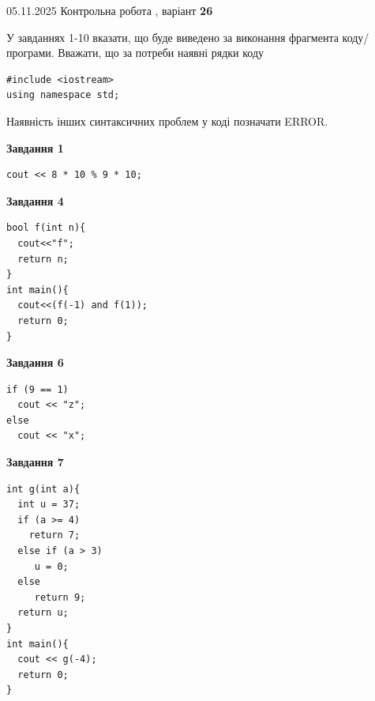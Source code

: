 \documentclass[12pt, ukrainian]{article}
\begin{document}
\newpage

{\Large{05.11.2025 Контрольна робота , варіант  \No \textbf { 26 }\par}}
{
\begin {large}
У завданнях 1-10 вказати, що буде виведено за виконання фрагмента коду/про\-гра\-ми.
Вважати, що за потреби наявні рядки коду
\begin{verbatim}
#include <iostream>
using namespace std;
\end{verbatim}
Наявність інших синтаксичних проблем у коді позначати ERROR.

\begin{minipage}[t]{7.0cm}

\begin{center}
\textbf{Завдання 1}
\end{center}
\vspace{-8mm}

\begin{verbatim}
cout << 8 * 10 % 9 * 10;
\end{verbatim}



\begin{center}
\textbf{Завдання 4}
\end{center}
\vspace{-8mm}

\begin{verbatim}
bool f(int n){
  cout<<"f";
  return n;
}
int main(){
  cout<<(f(-1) and f(1));
  return 0;
}
\end{verbatim}



\begin{center}
\textbf{Завдання 6}
\end{center}
\vspace{-8mm}

\begin{verbatim}
if (9 == 1)
  cout << "z";
else
  cout << "x";
\end{verbatim}



\begin{center}
\textbf{Завдання 7}
\end{center}
\vspace{-8mm}

\begin{verbatim}
int g(int a){
  int u = 37;
  if (a >= 4)
    return 7;
  else if (a > 3)
     u = 0;
  else
     return 9;
  return u;
}
int main(){
  cout << g(-4);
  return 0;
}
\end{verbatim}


\end{minipage}
\end{large}}
\end{document}
